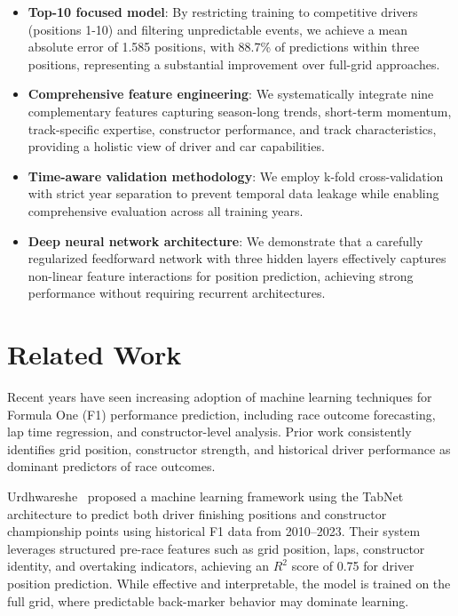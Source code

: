 \documentclass{article}
\begin{document}
\begin{itemize}
    \item \textbf{Top-10 focused model}: By restricting training to competitive drivers (positions 1-10) and filtering unpredictable events, we achieve a mean absolute error of 1.585 positions, with 88.7\% of predictions within three positions, representing a substantial improvement over full-grid approaches.
    
    \item \textbf{Comprehensive feature engineering}: We systematically integrate nine complementary features capturing season-long trends, short-term momentum, track-specific expertise, constructor performance, and track characteristics, providing a holistic view of driver and car capabilities.
    
    \item \textbf{Time-aware validation methodology}: We employ k-fold cross-validation with strict year separation to prevent temporal data leakage while enabling comprehensive evaluation across all training years.
    
    \item \textbf{Deep neural network architecture}: We demonstrate that a carefully regularized feedforward network with three hidden layers effectively captures non-linear feature interactions for position prediction, achieving strong performance without requiring recurrent architectures.
\end{itemize}


\section{Related Work}

Recent years have seen increasing adoption of machine learning techniques for Formula One (F1) performance prediction, including race outcome forecasting, lap time regression, and constructor-level analysis. Prior work consistently identifies grid position, constructor strength, and historical driver performance as dominant predictors of race outcomes.

Urdhwareshe~\cite{urdhwareshe2025} proposed a machine learning framework using the TabNet architecture to predict both driver finishing positions and constructor championship points using historical F1 data from 2010--2023. Their system leverages structured pre-race features such as grid position, laps, constructor identity, and overtaking indicators, achieving an $R^2$ score of 0.75 for driver position prediction. While effective and interpretable, the model is trained on the full grid, where predictable back-marker behavior may dominate learning.
\end{document}
